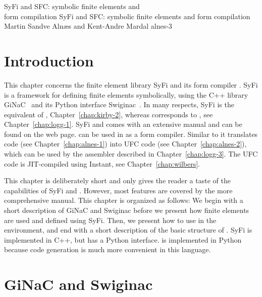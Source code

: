              {SyFi and SFC: symbolic finite elements and \\ form compilation}
              {SyFi and SFC: symbolic finite elements and form compilation}
              {Martin Sandve Aln\ae{}s and Kent-Andre Mardal}
              {alnes-3}

\renewcommand{\AA}{A}
\newcommand{\LL}{L}
\newcommand{\JJ}{J}
\newcommand{\syfi}{SyFi}


\section{Introduction}

This chapter concerns the finite element library \syfi{} and its form
compiler \sfc{}.  \syfi{} is a framework for defining finite elements
symbolically, using the C++ library GiNaC~\citep{BauerFrinkKreckel2000}
and its Python interface Swiginac~\citep{SkavhaugCertik2009}.  In many
respects, \syfi{} is the equivalent of \fiat, Chapter~\ref{chap:kirby-2},
whereas \sfc{} corresponds to \ffc{}, see Chapter~\ref{chap:logg-1}. \syfi{}
and \sfc{} comes with an extensive manual \citep{AlnaesMardal2009a}
and can be found on the \fenics{} web page.  \sfc{} can be used in
\fenics{} as a form compiler. Similar to \ffc{} it translates
\ufl{} code (see Chapter~\ref{chap:alnes-1}) into UFC code (see
Chapter~\ref{chap:alnes-2}), which can be used by the \dolfin{} assembler
described in Chapter~\ref{chap:logg-3}. The UFC code is JIT-compiled
using Instant, see Chapter~\ref{chap:wilbers}.

This chapter is deliberately short and only gives the reader a taste of
the capabilities of \syfi{} and \sfc{}.  However, most features are covered by
the more comprehensive manual.  This chapter is organized as follows:
We begin with a short description of GiNaC and Swiginac before we
present how finite elements are used and defined using \syfi{}.  Then, we
present how to use \sfc{} in the \dolfin{} environment, and end with a short
description of the basic structure of \sfc{}. \syfi{} is implemented in C++,
but has a Python interface. \sfc{} is implemented in Python because code
generation is much more convenient in this language.

\section{GiNaC and Swiginac}

